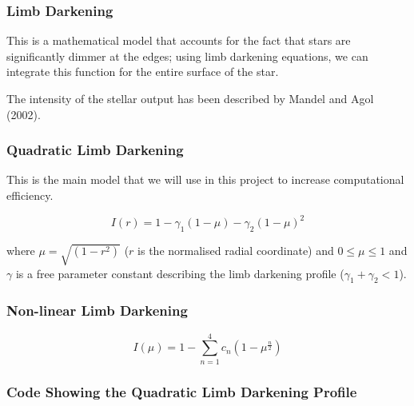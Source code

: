 \documentclass[11pt]{article}
\begin{document}
    \hypertarget{limb-darkening}{%
\subsubsection{Limb Darkening}\label{limb-darkening}}

This is a mathematical model that accounts for the fact that stars are significantly dimmer at the edges; using limb darkening equations, we can integrate this function for the entire surface of the star.

The intensity of the stellar output has been described by Mandel and Agol (2002).

\hypertarget{quadratic-limb-darkening}{%
\subsubsection{Quadratic Limb Darkening}\label{quadratic-limb-darkening}}

This is the main model that we will use in this project to increase
computational efficiency.

\begin{equation*}
I(r) = 1 - \gamma_{1}(1 - \mu) - \gamma_{2}(1 - \mu)^{2}
\end{equation*}

where \(\mu = \sqrt{(1 - r^{2})}\) (\(r\) is the normalised radial
coordinate) and \(0 \leqslant \mu \leqslant 1\) and \(\gamma\) is a free
parameter constant describing the limb darkening profile
(\(\gamma_{1} + \gamma_{2} < 1\)).

\hypertarget{non-linear-limb-darkening}{%
\subsubsection{Non-linear Limb Darkening}\label{non-linear-limb-darkening}}

\begin{equation*}
I(\mu) = 1 - \sum_{n = 1}^{4} c_{n}(1 - \mu^{\frac{n}{2}})
\end{equation*}

    \hypertarget{code-showing-the-quadratic-limb-darkening-profile}{%
\subsubsection{Code Showing the Quadratic Limb Darkening Profile}\label{code-showing-the-quadratic-limb-darkening-profile}}
\end{document}

